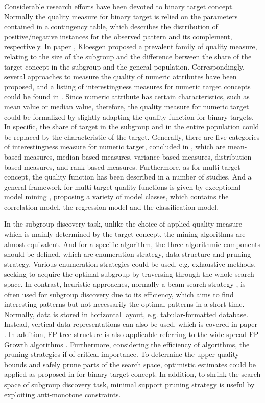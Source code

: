 Considerable research efforts have been devoted to binary target concept. Normally the quality measure for binary target is relied on the parameters contained in a contingency table, which describes the distribution of positive/negative instances for the observed pattern and its complement, respectively. In paper \cite{klosgen1996explora}, Kloesgen proposed a prevalent family of quality measure, relating to the size of the subgroup and the difference between the share of the target concept in the subgroup and the general population. Correspondingly, several approaches to measure the quality of numeric attributes have been proposed, and a listing of interestingness measures for numeric target concepts could be found in \cite{pieters2010subgroup}. Since numeric attribute has certain characteristics, such as mean value or median value, therefore, the quality measure for numeric target could be formalized by slightly adapting the quality function for binary targets. In specific, the share of target in the subgroup and in the entire population could be replaced by the characteristic of the target. Generally, there are five categories of interestingness measure for numeric target, concluded in \cite{lemmerich2014novel}, which are mean-based measures, median-based measures, variance-based measures, distribution-based measures, and rank-based measures. Furthermore, as for multi-target concept, the quality function has been described in a number of studies. And a general framework for multi-target quality functions is given by exceptional model mining \cite{leman2008exceptional}, proposing a variety of model classes, which contains the correlation model, the regression model and the classification model. 

In the subgroup discovery task, unlike the choice of applied quality measure which is mainly determined by the target concept, the mining algorithms are almost equivalent. And for a specific algorithm, the three algorithmic components should be defined, which are enumeration strategy, data structure and pruning strategy. Various enumeration strategies could be used, e.g. exhaustive methods, seeking to acquire the optimal subgroup by traversing through the whole search space. In contrast, heuristic approaches, normally a beam search strategy \cite{clark1989cn2}, is often used for subgroup discovery due to its efficiency, which aims to find interesting patterns but not necessarily the optimal patterns in a short time. Normally, data is stored in horizontal layout, e.g. tabular-formatted database. Instead, vertical data representations can also be used, which is covered in paper \cite{zaki2000scalable}. In addition, FP-tree structure is also applicable referring to the wide-spread FP-Growth algorithms \cite{han2000mining}. Furthermore, considering the efficiency of algorithms, the pruning strategies if of critical importance. To determine the upper quality bounds and safely prune parts of the search space, optimistic estimates could be applied as proposed in \cite{wrobel1997algorithm} for binary target concept. In addition, to shrink the search space of subgroup discovery task, minimal support pruning strategy is useful by exploiting anti-monotone constraints. 



